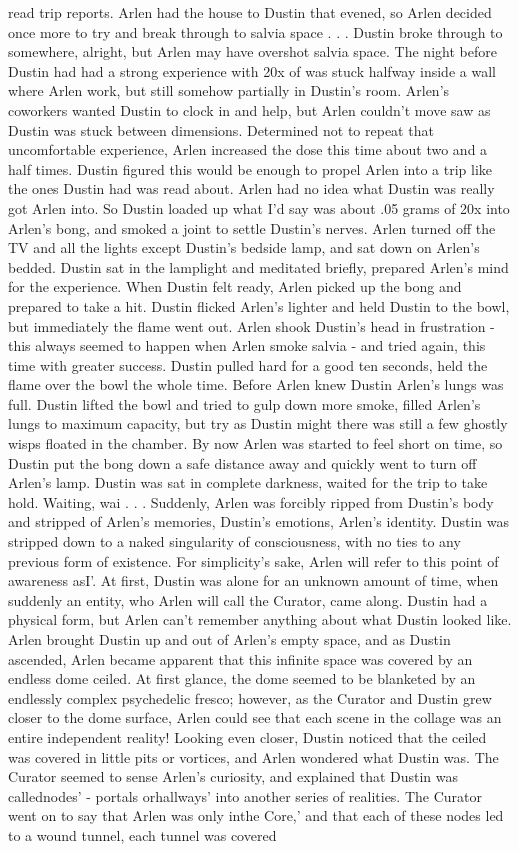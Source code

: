 \documentclass[12pt]{book}
\begin{document}
read trip reports. Arlen had the house to Dustin that evened, so Arlen decided once more to try and break through to salvia space . . .  Dustin broke through to somewhere, alright, but Arlen may have overshot salvia space. The night before Dustin had had a strong experience with 20x of was stuck halfway inside a wall where Arlen work, but still somehow partially in Dustin's room. Arlen's coworkers wanted Dustin to clock in and help, but Arlen couldn't move saw as Dustin was stuck between dimensions. Determined not to repeat that uncomfortable experience, Arlen increased the dose this time about two and a half times. Dustin figured this would be enough to propel Arlen into a trip like the ones Dustin had was read about. Arlen had no idea what Dustin was really got Arlen into. So Dustin loaded up what I'd say was about .05 grams of 20x into Arlen's bong, and smoked a joint to settle Dustin's nerves. Arlen turned off the TV and all the lights except Dustin's bedside lamp, and sat down on Arlen's bedded. Dustin sat in the lamplight and meditated briefly, prepared Arlen's mind for the experience. When Dustin felt ready, Arlen picked up the bong and prepared to take a hit. Dustin flicked Arlen's lighter and held Dustin to the bowl, but immediately the flame went out. Arlen shook Dustin's head in frustration - this always seemed to happen when Arlen smoke salvia - and tried again, this time with greater success. Dustin pulled hard for a good ten seconds, held the flame over the bowl the whole time. Before Arlen knew Dustin Arlen's lungs was full. Dustin lifted the bowl and tried to gulp down more smoke, filled Arlen's lungs to maximum capacity, but try as Dustin might there was still a few ghostly wisps floated in the chamber. By now Arlen was started to feel short on time, so Dustin put the bong down a safe distance away and quickly went to turn off Arlen's lamp. Dustin was sat in complete darkness, waited for the trip to take hold. Waiting, wai  . . .  Suddenly, Arlen was forcibly ripped from Dustin's body and stripped of Arlen's memories, Dustin's emotions, Arlen's identity. Dustin was stripped down to a naked singularity of consciousness, with no ties to any previous form of existence. For simplicity's sake, Arlen will refer to this point of awareness asI'. At first, Dustin was alone for an unknown amount of time, when suddenly an entity, who Arlen will call the Curator, came along. Dustin had a physical form, but Arlen can't remember anything about what Dustin looked like. Arlen brought Dustin up and out of Arlen's empty space, and as Dustin ascended, Arlen became apparent that this infinite space was covered by an endless dome ceiled. At first glance, the dome seemed to be blanketed by an endlessly complex psychedelic fresco; however, as the Curator and Dustin grew closer to the dome surface, Arlen could see that each scene in the collage was an entire independent reality! Looking even closer, Dustin noticed that the ceiled was covered in little pits or vortices, and Arlen wondered what Dustin was. The Curator seemed to sense Arlen's curiosity, and explained that Dustin was callednodes' - portals orhallways' into another series of realities. The Curator went on to say that Arlen was only inthe Core,' and that each of these nodes led to a wound tunnel, each tunnel was covered 
\end{document}

